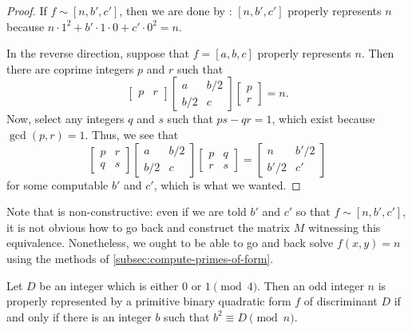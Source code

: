 \documentclass[../notes.tex]{subfiles}
\begin{document}
\begin{proof}
	If $f\sim[n,b',c']$, then we are done by : $[n,b',c']$ properly represents $n$ because $n\cdot1^2+b'\cdot1\cdot0+c'\cdot0^2=n$.

	In the reverse direction, suppose that $f=[a,b,c]$ properly represents $n$. Then there are coprime integers $p$ and $r$ such that
	\[\begin{bmatrix}
		p & r
	\end{bmatrix}\begin{bmatrix}
		a & b/2 \\
		b/2 & c
	\end{bmatrix}\begin{bmatrix}
		p \\ r
	\end{bmatrix}=n.\]
	Now, select any integers $q$ and $s$ such that $ps-qr=1$, which exist because $\gcd(p,r)=1$. Thus, we see that
	\[\begin{bmatrix}
		p & r \\
		q & s
	\end{bmatrix}\begin{bmatrix}
		a & b/2 \\
		b/2 & c
	\end{bmatrix}\begin{bmatrix}
		p & q \\ r & s
	\end{bmatrix}=\begin{bmatrix}
		n & b'/2 \\
		b'/2 & c'
	\end{bmatrix}\]
	for some computable $b'$ and $c'$, which is what we wanted.
\end{proof}
\begin{remark}
	Note that  is non-constructive: even if we are told $b'$ and $c'$ so that $f\sim[n,b',c']$, it is not obvious how to go back and construct the matrix $M$ witnessing this equivalence. Nonetheless, we ought to be able to go and back solve $f(x,y)=n$ using the methods of \cref{subsec:compute-primes-of-form}.
\end{remark}
\begin{corollary} \label{cor:some-form-by-qr}
	Let $D$ be an integer which is either $0$ or $1\pmod4$. Then an odd integer $n$ is properly represented by a primitive binary quadratic form $f$ of discriminant $D$ if and only if there is an integer $b$ such that $b^2\equiv D\pmod n$.
\end{corollary}
\end{document}
